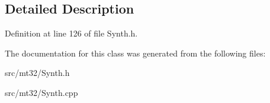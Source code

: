\subsection{Detailed Description}


Definition at line 126 of file Synth.\-h.



The documentation for this class was generated from the following files\-:\begin{DoxyCompactItemize}
\item 
src/mt32/Synth.\-h\item 
src/mt32/Synth.\-cpp\end{DoxyCompactItemize}
